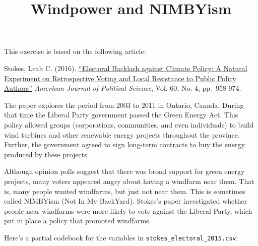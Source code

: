 \documentclass[]{article}
\title{Windpower and NIMBYism}
\author{}
\date{}
\begin{document}
\maketitle


This exercise is based on the following article:

Stokes, Leah C. (2016).
\href{https://doi.org/10.1111/ajps.12220}{``Electoral Backlash against
Climate Policy: A Natural Experiment on Retrospective Voting and Local
Resistance to Public Policy Authors''} \emph{American Journal of
Political Science}, Vol. 60, No. 4, pp.~958-974.

The paper explores the period from 2003 to 2011 in Ontario, Canada.
During that time the Liberal Party government passed the Green Energy
Act. This policy allowed groups (corporations, communities, and even
individuals) to build wind turbines and other renewable energy projects
throughout the province. Further, the government agreed to sign
long-term contracts to buy the energy produced by these projects.

Although opinion polls suggest that there was broad support for green
energy projects, many voters appeared angry about having a windfarm near
them. That is, many people wanted windfarms, but just not near them.
This is sometimes called NIMBYism (Not In My BackYard). Stokes's paper
investigated whether people near windfarms were more likely to vote
against the Liberal Party, which put in place a policy that promoted
windfarms.

Here's a partial codebook for the variables in
\texttt{stokes\_electoral\_2015.csv}:
\end{document}
